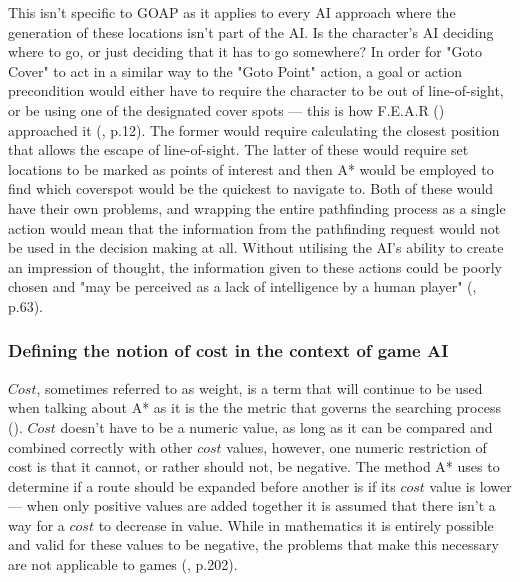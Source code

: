 \documentclass[11pt, a4paper]{article}
\begin{document}
This isn't specific to GOAP as it applies to every AI approach where the generation of these locations isn't part of the AI. Is the character's AI deciding where to go, or just deciding that it has to go somewhere? In order for "Goto Cover" to act in a similar way to the "Goto Point" action, a goal or action precondition would either have to require the character to be out of line-of-sight, or be using one of the designated cover spots --- this is how F.E.A.R (\citeyear{FEAR}) approached it (\cite{orkin2006three}, p.12). The former would require calculating the closest position that allows the escape of line-of-sight. The latter of these would require set locations to be marked as points of interest and then A* would be employed to find which coverspot would be the quickest to navigate to. Both of these would have their own problems, and wrapping the entire pathfinding process as a single action would mean that the information from the pathfinding request would not be used in the decision making at all. Without utilising the AI's ability to create an impression of thought, the information given to these actions could be poorly chosen and "may be perceived as a lack of intelligence by a human player" (\cite{graham2003pathfinding}, p.63).

\subsubsection{Defining the notion of cost in the context of game AI}

$Cost$, sometimes referred to as weight, is a term that will continue to be used when talking about A* as it is the the metric that governs the searching process (\cite{korf1985depth}). $Cost$ doesn't have to be a numeric value, as long as it can be compared and combined correctly with other $cost$ values, however, one numeric restriction of cost is that it cannot, or rather should not, be negative. The method A* uses to determine if a route should be expanded before another is if its $cost$ value is lower --- when only positive values are added together it is assumed that there isn't a way for a $cost$ to decrease in value. While in mathematics it is entirely possible and valid for these values to be negative, the problems that make this necessary are not applicable to games (\cite{millington2019ai}, p.202).
\end{document}
